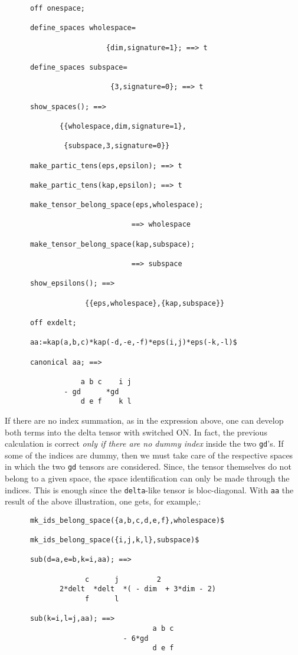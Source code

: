 \begin{verbatim}
      off onespace;

      define_spaces wholespace=

                        {dim,signature=1}; ==> t

      define_spaces subspace=

                         {3,signature=0}; ==> t

      show_spaces(); ==>

             {{wholespace,dim,signature=1},

              {subspace,3,signature=0}}

      make_partic_tens(eps,epsilon); ==> t

      make_partic_tens(kap,epsilon); ==> t

      make_tensor_belong_space(eps,wholespace);

                              ==> wholespace

      make_tensor_belong_space(kap,subspace);

                              ==> subspace

      show_epsilons(); ==>

                   {{eps,wholespace},{kap,subspace}}

      off exdelt;

      aa:=kap(a,b,c)*kap(-d,-e,-f)*eps(i,j)*eps(-k,-l)$

      canonical aa; ==>

                  a b c    i j
              - gd      *gd
                  d e f    k l
\end{verbatim}
If there are no index summation, as in the expression above, one can
develop both terms into the delta tensor with %
 switched ON.
In fact, the previous calculation is correct \emph{only if there are no
dummy index} inside the two \texttt{gd}'s.
If some of the indices are
dummy, then
we must
take care of the respective spaces in which the two \texttt{gd} tensors
are considered. Since, the tensor themselves do not belong
to a given space, the space identification can only be made through
the indices. This is enough since the \texttt{delta}-like tensor
is bloc-diagonal. With \texttt{aa} the result of the above illustration,
one gets, for example,:
\begin{verbatim}
      mk_ids_belong_space({a,b,c,d,e,f},wholespace)$

      mk_ids_belong_space({i,j,k,l},subspace)$

      sub(d=a,e=b,k=i,aa); ==>

                   c      j         2
             2*delt  *delt  *( - dim  + 3*dim - 2)
                   f      l

      sub(k=i,l=j,aa); ==>
                                   a b c
                            - 6*gd
                                   d e f
\end{verbatim}

